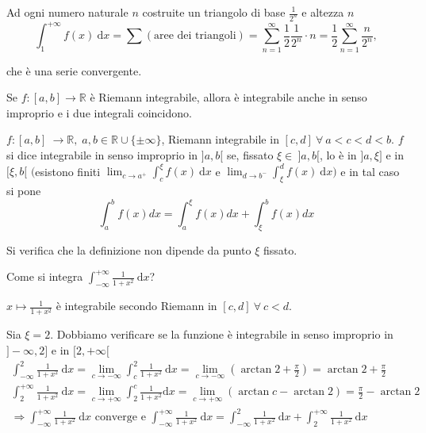 Ad ogni numero naturale $n$ costruite un triangolo di base $\frac{1}{2^n}$ e altezza $n$
\begin{equation*}
	\int_{1}^{+\infty} f(x) \ \mathrm{d}x = \sum (\text{aree dei triangoli}) = \sum_{n=1}^{\infty} \frac{1}{2} \frac{1}{2^n} \cdot n = \frac{1}{2} \sum_{n=1}^{\infty} \frac{n}{2^n}, 
\end{equation*}

che è una serie convergente.


\begin{attbar}
	Se $f:[a,b] \rightarrow \mathbb{R}$ è Riemann integrabile, allora è integrabile anche in senso improprio e i due integrali coincidono.
\end{attbar}


\begin{definition}
	$f:[a,b] \ \rightarrow \mathbb{R}, \; a,b \in \mathbb{R} \cup \{\pm \infty\}$, Riemann integrabile in $[c,d] \ \forall \ a < c < d < b$. $f$ si dice integrabile in senso improprio in $ ]a,b[$ se, fissato $\xi \in \ ]a,b[$, lo è in $]a, \xi]$ e in $[\xi,b[$ $\bigg($esistono finiti $\lim_{c \rightarrow a^+} \int_{c}^{\xi} f(x) \ \mathrm{d}x$ e $\lim_{d \rightarrow b^-} \int_{\xi}^{d} f(x) \ \mathrm{d}x \bigg)$ e in tal caso si pone 
	\begin{equation*}
		\int_{a}^{b} f(x)dx = \int_{a}^{\xi} f(x)dx + \int_{\xi}^{b} f(x) dx
	\end{equation*}
	
	Si verifica che la definizione non dipende da punto $\xi$ fissato.
\end{definition}


\begin{exbar}
\begin{example}
	Come si integra $\int_{-\infty}^{+\infty} \frac{1}{1+x^2} \ \mathrm{d}x$?
	
	$x \mapsto \frac{1}{1+x^2}$ è integrabile secondo Riemann in $[c,d] \ \forall  \ c < d$. 
	
	Sia $\xi = 2$. Dobbiamo verificare se la funzione è integrabile in senso improprio in $]-\infty,2] $ e in $ [2, +\infty[$
	\begin{gather*}
		\int_{-\infty}^{2} \frac{1}{1+x^2} \ \mathrm{d}x = \lim_{c \rightarrow -\infty} \int_{c}^{2} \frac{1}{1+x^2} \ \mathrm{d}x = \lim_{c \rightarrow -\infty} \left( \arctan{2 + \frac{\pi}{2}} \right)= \arctan{2 + \frac{\pi}{2}}
		\\
		\int_{2}^{+\infty} \frac{1}{1 + x^2} \ \mathrm{d}x = \lim_{c \rightarrow +\infty} \int_{2}^{c} \frac{1}{1 + x^2} \mathrm{d}x = \lim_{c \rightarrow +\infty} (\arctan{c} - \arctan{2}) = \frac{\pi}{2} - \arctan{2}
		\\
		\Rightarrow \int_{-\infty}^{+\infty} \frac{1}{1+x^2} \ \mathrm{d}x \text{ converge e } \int_{-\infty}^{+\infty} \frac{1}{1+x^2} \ \mathrm{d}x = \int_{-\infty}^{2} \frac{1}{1+x^2} \ \mathrm{d}x + \int_{2}^{+\infty} \frac{1}{1+x^2} \ \mathrm{d}x
	\end{gather*}
\end{example}
\end{exbar}


